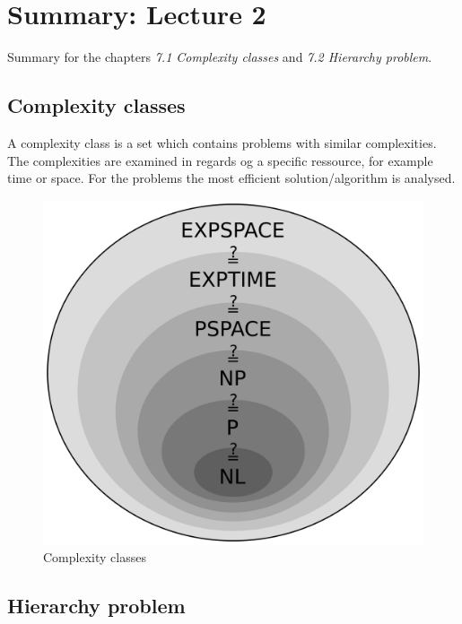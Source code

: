 \documentclass[a4]{scrartcl}
\begin{document}
\section*{Summary: Lecture 2}

Summary for the chapters \textit{7.1 Complexity classes} and \textit{7.2 Hierarchy problem}. \cite{book}

\subsection*{Complexity classes}

A complexity class is a set which contains problems with similar complexities. The complexities are examined in regards og a specific ressource, for example time or space. For the problems the most efficient solution/algorithm is analysed.

\begin{figure}[H]
\begin{center}
\includegraphics[scale=0.15]{images/classes.png}
\end{center}
\caption{Complexity classes \cite{classesPic}}
\end{figure}


\cite{GTI}

\subsection*{Hierarchy problem}



\newpage

\printbibliography
\end{document}
